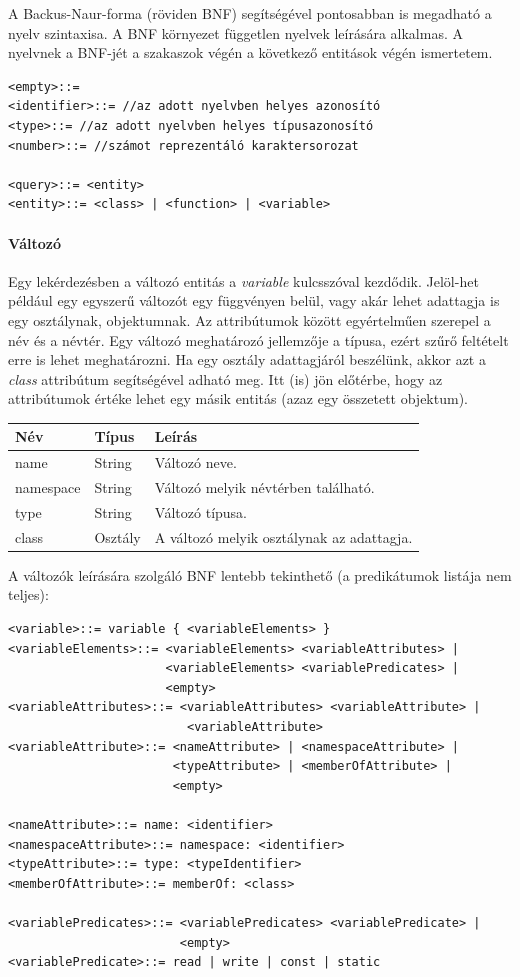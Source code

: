 \documentclass[a4paper,12pt]{report}
\begin{document}
\par A Backus-Naur-forma (röviden BNF) segítségével pontosabban is megadható a nyelv szintaxisa. A BNF környezet független nyelvek leírására alkalmas. A nyelvnek a BNF-jét a szakaszok végén a következő entitások végén ismertetem.
\begin{verbatim}
<empty>::=
<identifier>::= //az adott nyelvben helyes azonosító
<type>::= //az adott nyelvben helyes típusazonosító
<number>::= //számot reprezentáló karaktersorozat

<query>::= <entity>
<entity>::= <class> | <function> | <variable>
\end{verbatim} 
\paragraph{Változó}
Egy lekérdezésben a változó entitás a \textit{variable} kulcsszóval kezdődik. Jelöl-het például egy egyszerű változót egy függvényen belül, vagy akár lehet adattagja is egy osztálynak, objektumnak. Az attribútumok között egyértelműen szerepel a név és a névtér. Egy változó meghatározó jellemzője a típusa, ezért szűrő feltételt erre is lehet meghatározni. Ha egy osztály adattagjáról beszélünk, akkor azt a \textit{class} attribútum segítségével adható meg. Itt (is) jön előtérbe, hogy az attribútumok értéke lehet egy másik entitás (azaz egy összetett objektum).
\begin{center}
	\begin{tabular}{| l | l | l |}
		\hline
		Név & Típus & Leírás \\ \hline
		name & String & Változó neve. \\ \hline
		namespace & String & Változó melyik névtérben található. \\ \hline
		type & String & Változó típusa. \\ \hline
		class & Osztály & A változó melyik osztálynak az adattagja. \\ \hline
	\end{tabular}
\end{center}
A változók leírására szolgáló BNF lentebb tekinthető (a predikátumok listája nem teljes):
\begin{verbatim}
<variable>::= variable { <variableElements> }
<variableElements>::= <variableElements> <variableAttributes> | 
                      <variableElements> <variablePredicates> | 
                      <empty>
<variableAttributes>::= <variableAttributes> <variableAttribute> |
                         <variableAttribute>
<variableAttribute>::= <nameAttribute> | <namespaceAttribute> | 
                       <typeAttribute> | <memberOfAttribute> | 
                       <empty>

<nameAttribute>::= name: <identifier>
<namespaceAttribute>::= namespace: <identifier>
<typeAttribute>::= type: <typeIdentifier>
<memberOfAttribute>::= memberOf: <class>

<variablePredicates>::= <variablePredicates> <variablePredicate> | 
                        <empty>
<variablePredicate>::= read | write | const | static
\end{verbatim}
\end{document}

